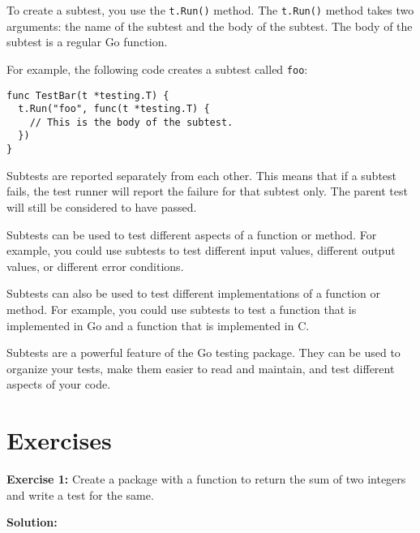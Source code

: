 To create a subtest, you use the \texttt{t.Run()} method. The \texttt{t.Run()} method takes
two arguments: the name of the subtest and the body of the subtest. The body of
the subtest is a regular Go function.

For example, the following code creates a subtest called \texttt{foo}:

\begin{lstlisting}[numbers=none]
func TestBar(t *testing.T) {
  t.Run("foo", func(t *testing.T) {
    // This is the body of the subtest.
  })
}
\end{lstlisting}

Subtests are reported separately from each other. This means that if a subtest
fails, the test runner will report the failure for that subtest only. The parent
test will still be considered to have passed.

Subtests can be used to test different aspects of a function or method. For
example, you could use subtests to test different input values, different output
values, or different error conditions.

Subtests can also be used to test different implementations of a function or
method. For example, you could use subtests to test a function that is
implemented in Go and a function that is implemented in C.

Subtests are a powerful feature of the Go testing package. They can be used to
organize your tests, make them easier to read and maintain, and test different
aspects of your code.


\section{Exercises}

{\bfseries Exercise 1:} Create a package with a function to return the
sum of two integers and write a test for the same.

\textbf{Solution:}

